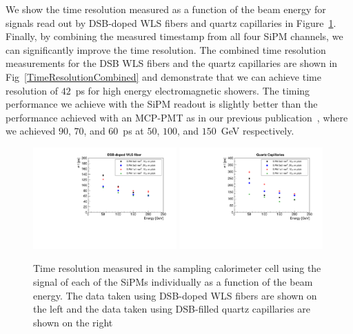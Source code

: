 We show the time resolution measured as a function of the beam energy for
signals read out by DSB-doped WLS fibers and quartz capillaries in
Figure~\ref{TimeResolutionVsEnergy}. Finally, by combining the measured
timestamp from all four SiPM channels, we can significantly improve the time
resolution. The combined time resolution measurements for the DSB WLS fibers and
the quartz capillaries are shown in Fig~\ref{TimeResolutionCombined} and
demonstrate that we can achieve time resolution of $42$~ps for high energy
electromagnetic showers. The timing performance we achieve with the SiPM readout
is slightly better than the performance achieved with an MCP-PMT as in our
previous publication~\cite{Anderson:2015gha}, where we achieved $90$, $70$, and
$60$~ps at $50$, $100$, and $150$~GeV  respectively. 


\begin{figure}[!htb]
\centering
\includegraphics[width=0.49\textwidth]{figures/ShashlikTimeResolutionVsEnergy_DSB.pdf}
\includegraphics[width=0.49\textwidth]{figures/ShashlikTimeResolutionVsEnergy_Capillaries.pdf}
\caption{\label{TimeResolutionVsEnergy} Time resolution measured in the sampling calorimeter 
cell using the signal of each of the SiPMs individually as a function of the beam energy. 
The data taken using DSB-doped WLS fibers are shown on
the left and the data taken using DSB-filled quartz capillaries are shown on the right}
\end{figure}



